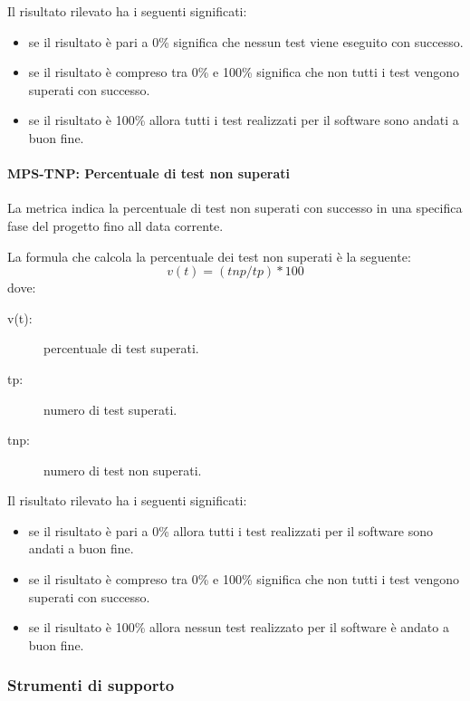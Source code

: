 \documentclass[../../norme-di-progetto.tex]{subfiles}
\begin{document}
Il risultato rilevato ha i seguenti significati:
\begin{itemize}
  \item se il risultato è pari a 0\% significa che nessun test viene eseguito con successo.
  \item se il risultato è compreso tra 0\% e 100\% significa che non tutti i test vengono superati con successo.
  \item se il risultato è 100\% allora tutti i test realizzati per il software sono andati a buon fine.
\end{itemize}




\paragraph{MPS-TNP: Percentuale di test non superati}%
\label{par:MPS-TNP_test_non_passati}

La metrica indica la percentuale di test non superati con successo in una specifica fase del progetto fino all data corrente.

La formula che calcola la percentuale dei test non superati è la seguente:
\[
 v(t) = (tnp / tp) * 100
\]
dove:
\begin{description}
 \item[v(t):] percentuale di test superati. %
 \item[tp:] numero di test superati.
 \item[tnp:] numero di test non superati.

\end{description}

Il risultato rilevato ha i seguenti significati:
\begin{itemize}
  \item se il risultato è pari a 0\% allora tutti i test realizzati per il software sono andati a buon fine.
  \item se il risultato è compreso tra 0\% e 100\% significa che non tutti i test vengono superati con successo.
  \item se il risultato è 100\% allora nessun test realizzato per il software è andato a buon fine.
\end{itemize}




\subsubsection{Strumenti di supporto}%
\label{subs:verifica/strumenti}
\end{document}
